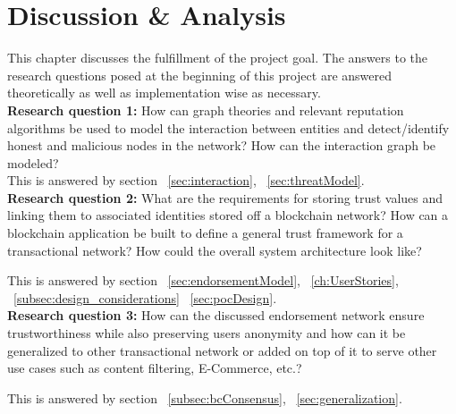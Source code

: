 \chapter{Discussion \& Analysis} \label{ch:discussion}
This chapter discusses the fulfillment of the project goal. The answers to the
research questions posed at the beginning of this project are answered
theoretically as well as implementation wise as necessary.\\

\textbf{Research question 1: }How can graph theories and relevant reputation
algorithms be used to model the interaction between entities and
detect/identify honest and malicious nodes in the network? How can the
interaction graph be modeled? \\

This is answered by section ~\ref{sec:interaction},
~\ref{sec:threatModel}.\\

\textbf{Research question 2: }What are the requirements for storing trust values
and linking them to associated identities stored off a blockchain network? How
can a blockchain application be built to define a general trust framework for a
transactional network? How could the overall system architecture look like?

This is answered by section ~\ref{sec:endorsementModel},
~\ref{ch:UserStories}, ~\ref{subsec:design_considerations}
~\ref{sec:pocDesign}. \\

\textbf{Research question 3: }How can the discussed endorsement network ensure
trustworthiness while also preserving users anonymity and how can it be
generalized to other transactional network or added on top of it to serve other
use cases such as content filtering, E-Commerce, etc.?

This is answered by section ~\ref{subsec:bcConsensus},
~\ref{sec:generalization}.\\

